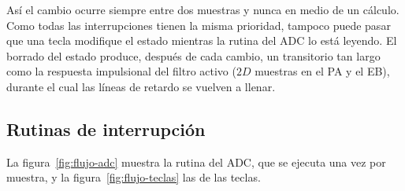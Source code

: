 \documentclass[11pt,a4paper]{article}
\begin{document}
Así el cambio ocurre siempre entre dos muestras y nunca en medio de un
cálculo. Como todas las interrupciones tienen la misma prioridad, tampoco
puede pasar que una tecla modifique el estado mientras la rutina del ADC lo
está leyendo. El borrado del estado produce, después de cada cambio, un
transitorio tan largo como la respuesta impulsional del filtro activo ($2D$
muestras en el PA y el EB), durante el cual las líneas de retardo se vuelven
a llenar.

\subsection{Rutinas de interrupción}

La figura~\ref{fig:flujo-adc} muestra la rutina del ADC, que se ejecuta una
vez por muestra, y la figura~\ref{fig:flujo-teclas} las de las teclas.
\end{document}
